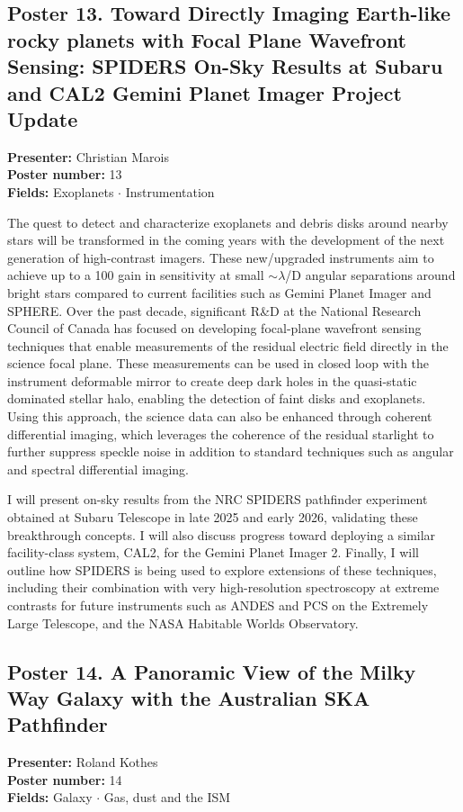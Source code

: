 \hypertarget{poster-abstract-talk-218}{}\label{poster-abstract-page-talk-218}
\subsection*{Poster 13. Toward Directly Imaging Earth-like rocky planets with Focal Plane Wavefront Sensing: SPIDERS On-Sky Results at Subaru and CAL2 Gemini Planet Imager Project Update}
\textbf{Presenter:} Christian Marois\\
\textbf{Poster number:} 13\\
\textbf{Fields:} Exoplanets $\cdot$ Instrumentation

The quest to detect and characterize exoplanets and debris disks around nearby stars will be transformed in the coming years with the development of the next generation of high-contrast imagers. These new/upgraded instruments aim to achieve up to a 100 gain in sensitivity at small $\sim$$\lambda$/D angular separations around bright stars compared to current facilities such as Gemini Planet Imager and SPHERE. Over the past decade, significant R\&D at the National Research Council of Canada has focused on developing focal-plane wavefront sensing techniques that enable measurements of the residual electric field directly in the science focal plane. These measurements can be used in closed loop with the instrument deformable mirror to create deep dark holes in the quasi-static dominated stellar halo, enabling the detection of faint disks and exoplanets. Using this approach, the science data can also be enhanced through coherent differential imaging, which leverages the coherence of the residual starlight to further suppress speckle noise in addition to standard techniques such as angular and spectral differential imaging.

I will present on-sky results from the NRC SPIDERS pathfinder experiment obtained at Subaru Telescope in late 2025 and early 2026, validating these breakthrough concepts. I will also discuss progress toward deploying a similar facility-class system, CAL2, for the Gemini Planet Imager 2. Finally, I will outline how SPIDERS is being used to explore extensions of these techniques, including their combination with very high-resolution spectroscopy at extreme contrasts for future instruments such as ANDES and PCS on the Extremely Large Telescope, and the NASA Habitable Worlds Observatory.

\hypertarget{poster-abstract-talk-318}{}\label{poster-abstract-page-talk-318}
\subsection*{Poster 14. A Panoramic View of the Milky Way Galaxy with the Australian SKA Pathfinder}
\textbf{Presenter:} Roland Kothes\\
\textbf{Poster number:} 14\\
\textbf{Fields:} Galaxy $\cdot$ Gas, dust and the ISM

